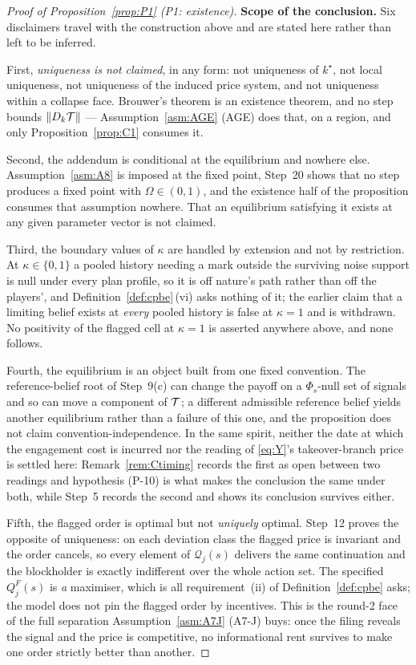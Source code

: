 \begin{proof}[Proof of Proposition~\ref{prop:P1} (P1: existence)]
\medskip
\noindent\textbf{Scope of the conclusion.}
Six disclaimers travel with the construction above and are stated here rather than left to be
inferred.

First, \emph{uniqueness is not claimed}, in any form: not uniqueness of $k^\star$, not local
uniqueness, not uniqueness of the induced price system, and not uniqueness within a collapse face.
Brouwer's theorem is an existence theorem, and no step bounds $\lVert D_k\mathcal{T}\rVert$ ---
Assumption~\ref{asm:AGE} (AGE) does that, on a region, and only Proposition~\ref{prop:C1} consumes it.

Second, the addendum is conditional at the equilibrium and nowhere else.
Assumption~\ref{asm:A8} is imposed at the fixed point, Step~20 shows that no step produces a fixed
point with $\Omega \in (0,1)$, and the existence half of the proposition consumes that assumption
nowhere. That an equilibrium satisfying it exists at any given parameter vector is not claimed.

Third, the boundary values of $\kappa$ are handled by extension and not by restriction. At
$\kappa \in \{0,1\}$ a pooled history needing a mark outside the surviving noise support is null
under every plan profile, so it is off nature's path rather than off the players', and
Definition~\ref{def:cpbe}\,(vi) asks nothing of it; the earlier claim that a limiting belief exists at
\emph{every} pooled history is false at $\kappa = 1$ and is withdrawn. No positivity of the flagged
cell at $\kappa = 1$ is asserted anywhere above, and none follows.

Fourth, the equilibrium is an object built from one fixed convention. The reference-belief root of
Step~9(c) can change the payoff on a $\Phi_s$-null set of signals and so can move a component of
$\mathcal{T}$; a different admissible reference belief yields another equilibrium rather than a failure of
this one, and the proposition does not claim convention-independence. In the same spirit, neither the
date at which the engagement cost is incurred nor the reading of \eqref{eq:Y}'s takeover-branch price
is settled here: Remark~\ref{rem:Ctiming} records the first as open between two readings and
hypothesis (P-10) is what makes the conclusion the same under both, while Step~5 records the second
and shows its conclusion survives either.

Fifth, the flagged order is optimal but not \emph{uniquely} optimal. Step~12 proves the opposite of
uniqueness: on each deviation class the flagged price is invariant and the order cancels, so every
element of $\mathcal Q_j(s)$ delivers the same continuation and the blockholder is exactly
indifferent over the whole action set. The specified $Q_j^F(s)$ is \emph{a} maximiser, which is all
requirement~(ii) of Definition~\ref{def:cpbe} asks; the model does not pin the flagged order by
incentives. This is the round-2 face of the full separation Assumption~\ref{asm:A7J} (A7-J) buys: once the
filing reveals the signal and the price is competitive, no informational rent survives to make one
order strictly better than another.


\end{proof}
